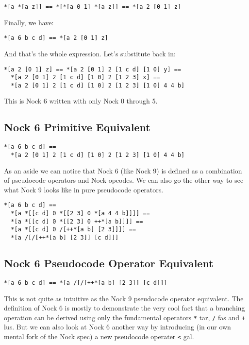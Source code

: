 \documentclass[twoside]{article}
\begin{document}
\begin{lstlisting}[style=listingblock]
*[a *[a z]] == *[*[a 0 1] *[a z]] == *[a 2 [0 1] z]
\end{lstlisting}

Finally, we have:

\begin{lstlisting}[style=listingblock]
*[a 6 b c d] == *[a 2 [0 1] z]
\end{lstlisting}

And that's the whole expression. Let's substitute back in:

\begin{lstlisting}[style=listingblock]
*[a 2 [0 1] z] == *[a 2 [0 1] 2 [1 c d] [1 0] y] ==
  *[a 2 [0 1] 2 [1 c d] [1 0] 2 [1 2 3] x] ==
  *[a 2 [0 1] 2 [1 c d] [1 0] 2 [1 2 3] [1 0] 4 4 b]
\end{lstlisting}

This is Nock 6 written with only Nock 0 through 5.

\subsection*{Nock 6 Primitive Equivalent}

\begin{lstlisting}[style=listingcode]
*[a 6 b c d] ==
  *[a 2 [0 1] 2 [1 c d] [1 0] 2 [1 2 3] [1 0] 4 4 b]
\end{lstlisting}

As an aside we can notice that Nock 6 (like Nock 9) is defined as a combination of pseudocode operators and Nock opcodes. We can also go the other way to see what Nock 9 looks like in pure pseudocode operators.

\begin{lstlisting}[style=listingblock]
*[a 6 b c d] ==
  *[a *[[c d] 0 *[[2 3] 0 *[a 4 4 b]]]] ==
  *[a *[[c d] 0 *[[2 3] 0 ++*[a b]]]] ==
  *[a *[[c d] 0 /[++*[a b] [2 3]]]] ==
  *[a /[/[++*[a b] [2 3]] [c d]]]
\end{lstlisting}

\subsection*{Nock 6 Pseudocode Operator Equivalent}

\begin{lstlisting}[style=listingcode]
*[a 6 b c d] == *[a /[/[++*[a b] [2 3]] [c d]]]
\end{lstlisting}

This is not quite as intuitive as the Nock 9 pseudocode operator equivalent. The definition of Nock 6 is mostly to demonstrate the very cool fact that a branching operation can be derived using only the fundamental operators \lstinline[style=inlinecode]{*} tar, \lstinline[style=inlinecode]{/} fas and \lstinline[style=inlinecode]{+} lus. But we can also look at Nock 6 another way by introducing (in our own mental fork of the Nock spec) a new pseudocode operater \lstinline[style=inlinecode]{<} gal.
\end{document}
